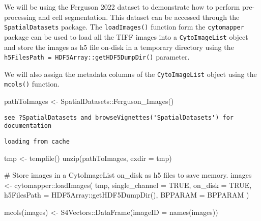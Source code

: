 \documentclass[
  letterpaper,
  DIV=11,
  numbers=noendperiod]{scrreprt}
\newenvironment{Shaded}{\begin{snugshade}}{\end{snugshade}}
\newcommand{\AttributeTok}[1]{\textcolor[rgb]{0.40,0.45,0.13}{#1}}
\newcommand{\CommentTok}[1]{\textcolor[rgb]{0.37,0.37,0.37}{#1}}
\newcommand{\ConstantTok}[1]{\textcolor[rgb]{0.56,0.35,0.01}{#1}}
\newcommand{\FunctionTok}[1]{\textcolor[rgb]{0.28,0.35,0.67}{#1}}
\newcommand{\NormalTok}[1]{\textcolor[rgb]{0.00,0.23,0.31}{#1}}
\newcommand{\OtherTok}[1]{\textcolor[rgb]{0.00,0.23,0.31}{#1}}
\newcommand{\SpecialCharTok}[1]{\textcolor[rgb]{0.37,0.37,0.37}{#1}}
\begin{document}
We will be using the Ferguson 2022 dataset to demonstrate how to perform
pre-processing and cell segmentation. This dataset can be accessed
through the \texttt{SpatialDatasets} package. The \texttt{loadImages()}
function form the \texttt{cytomapper} package can be used to load all
the TIFF images into a \texttt{CytoImageList} object and store the
images as h5 file on-disk in a temporary directory using the
\texttt{h5FilesPath\ =\ HDF5Array::getHDF5DumpDir()} parameter.

We will also assign the metadata columns of the \texttt{CytoImageList}
object using the \texttt{mcols()} function.

\begin{Shaded}
\begin{Highlighting}[]
\NormalTok{pathToImages }\OtherTok{\textless{}{-}}\NormalTok{ SpatialDatasets}\SpecialCharTok{::}\FunctionTok{Ferguson\_Images}\NormalTok{()}
\end{Highlighting}
\end{Shaded}

\begin{verbatim}
see ?SpatialDatasets and browseVignettes('SpatialDatasets') for documentation
\end{verbatim}

\begin{verbatim}
loading from cache
\end{verbatim}

\begin{Shaded}
\begin{Highlighting}[]
\NormalTok{tmp }\OtherTok{\textless{}{-}} \FunctionTok{tempfile}\NormalTok{()}
\FunctionTok{unzip}\NormalTok{(pathToImages, }\AttributeTok{exdir =}\NormalTok{ tmp)}

\CommentTok{\# Store images in a CytoImageList on\_disk as h5 files to save memory.}
\NormalTok{images }\OtherTok{\textless{}{-}}\NormalTok{ cytomapper}\SpecialCharTok{::}\FunctionTok{loadImages}\NormalTok{(}
\NormalTok{  tmp,}
  \AttributeTok{single\_channel =} \ConstantTok{TRUE}\NormalTok{,}
  \AttributeTok{on\_disk =} \ConstantTok{TRUE}\NormalTok{,}
  \AttributeTok{h5FilesPath =}\NormalTok{ HDF5Array}\SpecialCharTok{::}\FunctionTok{getHDF5DumpDir}\NormalTok{(),}
  \AttributeTok{BPPARAM =}\NormalTok{ BPPARAM}
\NormalTok{)}

\FunctionTok{mcols}\NormalTok{(images) }\OtherTok{\textless{}{-}}\NormalTok{ S4Vectors}\SpecialCharTok{::}\FunctionTok{DataFrame}\NormalTok{(}\AttributeTok{imageID =} \FunctionTok{names}\NormalTok{(images))}
\end{Highlighting}
\end{Shaded}
\end{document}
